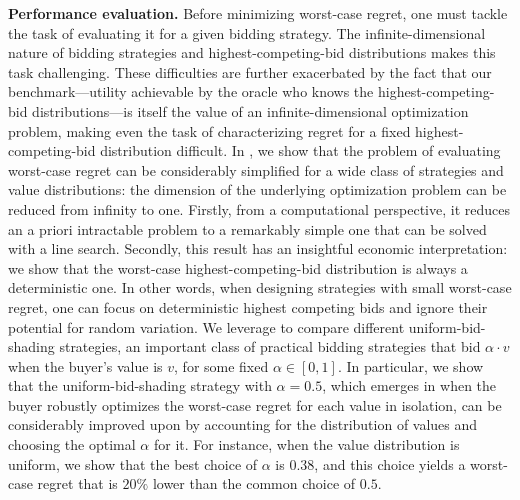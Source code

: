 \textbf{Performance evaluation.} Before minimizing worst-case regret, one must tackle the task of evaluating it for a given bidding strategy. The infinite-dimensional nature of bidding strategies and highest-competing-bid distributions makes this task challenging. These difficulties are further exacerbated by the fact that our benchmark---utility achievable by the oracle who knows the highest-competing-bid distributions---is itself the value of an infinite-dimensional optimization problem, making even the task of characterizing regret for a fixed highest-competing-bid distribution difficult. In , we show that the problem of evaluating worst-case regret can be considerably simplified for a wide class of strategies and value distributions: the dimension of the underlying optimization problem can be reduced from infinity to one. Firstly, from a computational perspective, it reduces an a priori intractable problem to a remarkably simple one that can be solved with a line search. Secondly, this result has an insightful economic interpretation: we show that the worst-case highest-competing-bid distribution is always a deterministic one. In other words, when designing strategies with small worst-case regret, one can focus on deterministic highest competing bids and ignore their potential for random variation. We leverage  to compare different uniform-bid-shading strategies, an important class of practical bidding strategies that bid $\alpha \cdot v$ when the buyer's value is $v$, for some fixed $\alpha \in [0,1]$. In particular, we show that the uniform-bid-shading strategy with $\alpha = 0.5$, which emerges in \citet{kasberger2023robust} when the buyer robustly optimizes the worst-case regret for each value in isolation, can be considerably improved upon by accounting for the distribution of values and choosing the optimal $\alpha$ for it. For instance, when the value distribution is uniform, we show that the best choice of $\alpha$ is $0.38$, and this choice yields a worst-case regret that is $20\%$ lower than the common choice of $0.5$. 



